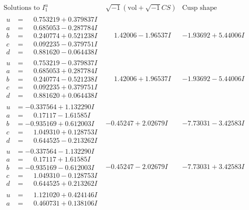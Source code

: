 \documentclass[1p]{elsarticle_modified}
\theoremstyle{definition}
\newcommand{\I}{\sqrt{-1}}
\begin{document}
$$\begin{array}{c|c|c}  
\text{Solutions to }I^u_{1}& \I (\text{vol} + \sqrt{-1}CS) & \text{Cusp shape}\\
 \hline 
\begin{aligned}
u &= \phantom{-}0.753219 + 0.379837 I \\
a &= \phantom{-}0.685053 - 0.287784 I \\
b &= \phantom{-}0.240774 + 0.521238 I \\
c &= \phantom{-}0.092235 - 0.379751 I \\
d &= \phantom{-}0.881620 - 0.064438 I\end{aligned}
 & \phantom{-}1.42006 - 1.96537 I & -1.93692 + 5.44006 I \\ \hline\begin{aligned}
u &= \phantom{-}0.753219 - 0.379837 I \\
a &= \phantom{-}0.685053 + 0.287784 I \\
b &= \phantom{-}0.240774 - 0.521238 I \\
c &= \phantom{-}0.092235 + 0.379751 I \\
d &= \phantom{-}0.881620 + 0.064438 I\end{aligned}
 & \phantom{-}1.42006 + 1.96537 I & -1.93692 - 5.44006 I \\ \hline\begin{aligned}
u &= -0.337564 + 1.132290 I \\
a &= \phantom{-}0.17117 - 1.61585 I \\
b &= -0.935169 + 0.612003 I \\
c &= \phantom{-}1.049310 + 0.128753 I \\
d &= \phantom{-}0.644525 - 0.213262 I\end{aligned}
 & -0.45247 + 2.02679 I & -7.73031 - 3.42583 I \\ \hline\begin{aligned}
u &= -0.337564 - 1.132290 I \\
a &= \phantom{-}0.17117 + 1.61585 I \\
b &= -0.935169 - 0.612003 I \\
c &= \phantom{-}1.049310 - 0.128753 I \\
d &= \phantom{-}0.644525 + 0.213262 I\end{aligned}
 & -0.45247 - 2.02679 I & -7.73031 + 3.42583 I \\ \hline\begin{aligned}
u &= \phantom{-}1.121020 + 0.424146 I \\
a &= \phantom{-}0.460731 + 0.138106 I \\

\end{aligned}
\end{array}$$
\end{document}
